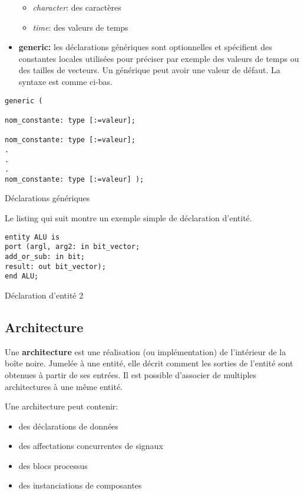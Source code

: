 \documentclass[11pt]{article}
\begin{document}
\begin{itemize}
\begin{itemize}
\item \emph{character}: des caractères

\item \emph{time}: des valeurs de temps
\end{itemize}

\item \textbf{generic:} les déclarations génériques sont optionnelles et
spécifient des constantes locales utilisées pour préciser par
exemple des valeurs de temps ou des tailles de vecteurs. Un
générique peut avoir une valeur de défaut. La syntaxe est comme ci-bas.
\end{itemize}

\begin{listing}[htbp]
\begin{verbatim}
generic (

nom_constante: type [:=valeur];

nom_constante: type [:=valeur];
.
.
.
nom_constante: type [:=valeur] );
\end{verbatim}
\caption{Déclarations génériques}
\end{listing}


Le listing qui suit montre un exemple simple de déclaration d'entité. 

\begin{listing}[htbp]
\begin{verbatim}
entity ALU is
port (argl, arg2: in bit_vector;
add_or_sub: in bit;
result: out bit_vector);
end ALU;
\end{verbatim}
\caption{Déclaration d'entité 2}
\end{listing}

\subsection{Architecture}
\label{sec:org6d60414}

Une \textbf{architecture} est une réalisation (ou implémentation) de
l'intérieur de la boîte noire. Jumelée à une entité, elle décrit
comment les sorties de l'entité sont obtenues à partir de ses
entrées. Il est possible d'associer de multiples architectures à une
même entité.

Une architecture peut contenir:

\begin{itemize}
\item des déclarations de données

\item des affectations concurrentes de signaux

\item des blocs processus

\item des instanciations de composantes
\end{itemize}
\end{document}
